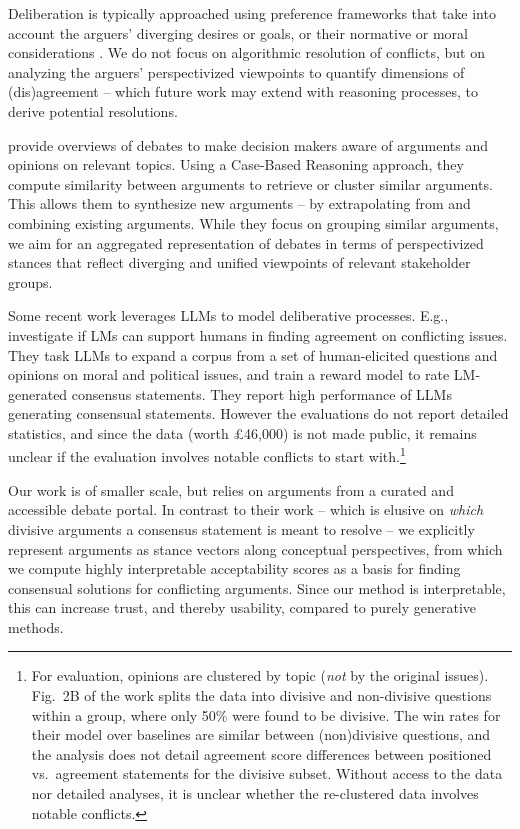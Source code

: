 Deliberation is typically approached using pre\-fer\-ence frameworks that take into account the arguers' diverging desires or goals, or their normative or moral considerations \citep{modgil,Amgound-etal-2014-preference,10.1007/978-3-319-69131-2_25}. We do not focus on algorithmic resolution of conflicts, but on analyzing the arguers' perspectivized viewpoints to quantify dimensions of (dis)agreement -- which future work may extend with reasoning processes, to derive potential resolutions. 

\citet{RECAP-2018} provide overviews of debates to make decision makers aware of arguments and opinions on relevant topics. Using a Case-Based Reasoning approach, they compute similarity between arguments to retrieve or cluster similar arguments. This allows them to synthesize new arguments -- by extrapolating from and combining existing arguments. 
While they focus on grouping similar arguments, we aim for an aggregated representation of debates in terms of perspectivized stances that reflect diverging and unified viewpoints of relevant stakeholder groups.

Some recent work leverages LLMs to model deliberative processes. E.g., \citet{bakker-etal-2022-finetuning} investigate if LMs can support humans in finding agreement on conflicting issues. They task LLMs to expand a corpus from a set of human-elicited questions and opinions on moral and political issues, 
and train a reward model to rate LM-generated consensus statements. 
They report high performance of LLMs generating consensual statements. However the evaluations do not report detailed statistics, and since the data
(worth £46,000) is not made public, it remains unclear if the evaluation involves notable conflicts to start with.\footnote{For evaluation,  opinions are clustered by topic (\textit{not} by the original issues). 
Fig.\ 2B of the work splits the data into divisive and non-divisive questions within a group, where only 50\% were found to be divisive. The win rates for their model over baselines are similar between (non)divisive  questions, and the analysis does not detail agreement score differences between positioned vs.\ agreement statements for the divisive subset. Without access to the data nor detailed analyses, it is unclear whether the re-clustered data involves notable conflicts.}


Our work is of smaller scale, but relies on arguments from a curated and accessible debate portal. 
In contrast to their work -- which is elusive on %
\textit{which} divisive arguments a consensus statement is meant to resolve --
we explicitly represent arguments as stance vectors along conceptual perspectives, from which we compute highly interpretable acceptability scores as a basis for finding consensual solutions for conflicting arguments. Since our method is interpretable, this can 
increase trust, and thereby usability, compared to purely generative methods.